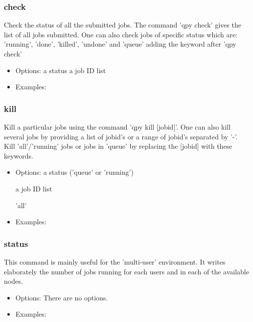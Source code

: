 \documentclass[a4paper,12pt]{article}
\begin{document}
\subsubsection{check}

Check the status of all the submitted jobs.
The command 'qpy check' gives the list of all jobs submitted.
One can also check jobs of specific status which are: 'running', 'done', 'killed', 'undone' and 'queue' adding the keyword after 'qpy check'


\begin{itemize}

\item Options:
  a status
  a job ID list
  
\item Examples:

\end{itemize}

\subsubsection{kill}

Kill a particular jobs using the command 'qpy kill [jobid]'. One can also kill several jobs by providing a list of jobid's or a range of jobid's separated by '-'. Kill 'all'/'running' jobs or jobs in 'queue' by replacing the [jobid] with these keywords. 


\begin{itemize}
\item Options:
  a status ('queue' or 'running')

  a job ID list

  'all'  

\item Examples:

\end{itemize}


\subsubsection{status}

This command is mainly useful for the 'multi-user' environment.
It writes elaborately the number of jobs running for each users and in each of the available nodes. 

\begin{itemize}
\item Options:
  There are no options.
  
\item Examples:

\end{itemize}
\end{document}
